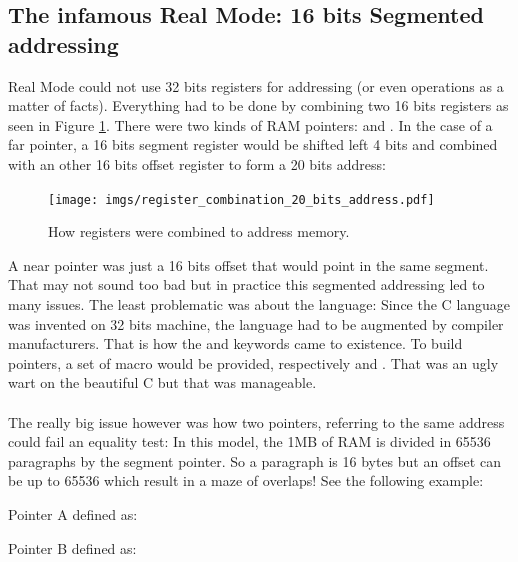 \documentclass[book.tex]{subfiles}
\begin{document}
\subsection{The infamous Real Mode: 16 bits Segmented addressing}
Real Mode could not use 32 bits registers for addressing (or even operations as a matter of facts). Everything had to be done by combining two 16 bits registers as seen in Figure \ref{fig:register_comb_to_20_bits}. There were two kinds of RAM pointers:  and . In the case of a far pointer, a 16 bits segment register would be shifted left 4 bits and combined with an other 16 bits offset register to form a 20 bits address:\\
\begin{figure}[H]
\centering
\texttt{[image: imgs/register\_combination\_20\_bits\_address.pdf]}
\caption{How registers were combined to address memory.}
\label{fig:register_comb_to_20_bits}
\end{figure}
A near pointer was just a 16 bits offset that would point in the same segment. That may not sound too bad but in practice this segmented addressing led to many issues. The least problematic was about the language: Since the C language was invented on 32 bits machine, the language had to be augmented by compiler manufacturers. That is how the  and  keywords came to existence. To build pointers, a set of macro would be provided, respectively  and . That was an ugly wart on the beautiful C but that was manageable.\\
\\
The really big issue however was how two pointers, referring to the same address could fail an equality test: In this model, the 1MB of RAM is divided in 65536 paragraphs by the segment pointer. So a paragraph is 16 bytes but an offset can be up to 65536 which result in a maze of overlaps! See the following example:\\
\par
Pointer A defined as:\\
\par
\begin{minipage}{\textwidth}

\end{minipage}

\bigskip

Pointer B defined as:\\
\par
\begin{minipage}{\textwidth}

\end{minipage}
\end{document}
